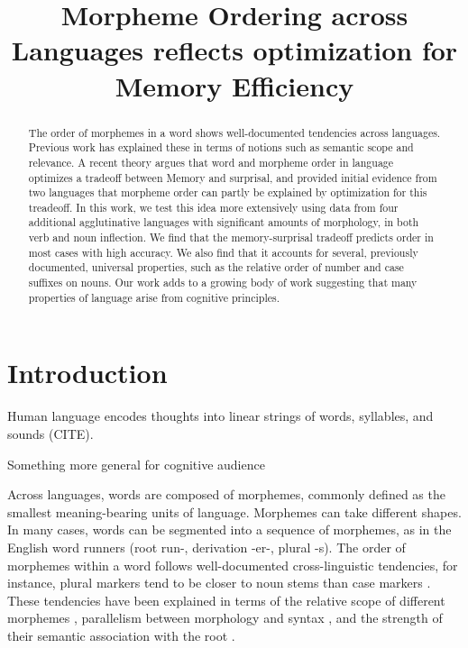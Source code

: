 \documentclass[11pt,letterpaper]{article}
\title{Morpheme Ordering across Languages reflects optimization for Memory Efficiency}
\begin{document}
\maketitle

\begin{abstract}
The order of morphemes in a word shows well-documented tendencies across languages.
Previous work has explained these in terms of notions such as semantic scope and relevance.
A recent theory argues that word and morpheme order in language optimizes a tradeoff between Memory and surprisal, and provided initial evidence from two languages that morpheme order can partly be explained by optimization for this treadeoff.
In this work, we test this idea more extensively using data from four additional agglutinative languages with significant amounts of morphology, in both verb and noun inflection.
We find that the memory-surprisal tradeoff predicts order in most cases with high accuracy.
We also find that it accounts for several, previously documented, universal properties, such as the relative order of number and case suffixes on nouns.
Our work adds to a growing body of work suggesting that many properties of language arise from cognitive principles.
\end{abstract}


\section{Introduction}

Human language encodes thoughts into linear strings of words, syllables, and sounds (CITE).

Something more general for cognitive audience

Across languages, words are composed of morphemes, commonly defined as the smallest meaning-bearing units of language.
Morphemes can take different shapes.
In many cases, words can be segmented into a sequence of morphemes, as in the English word runners (root run-, derivation -er-, plural -s).
The order of morphemes within a word follows well-documented cross-linguistic tendencies, for instance, plural markers tend to be closer to noun stems than case markers \citep[112]{greenberg1963universals}.
These tendencies have been explained in terms of the relative scope of different morphemes  \citep{rice2000morpheme}, parallelism between morphology and syntax \citep{givon1971historical,venneman1973explanation,baker1985the}, and the strength of their semantic association with the root \citep{bybee-morphology-1985}.
\end{document}
